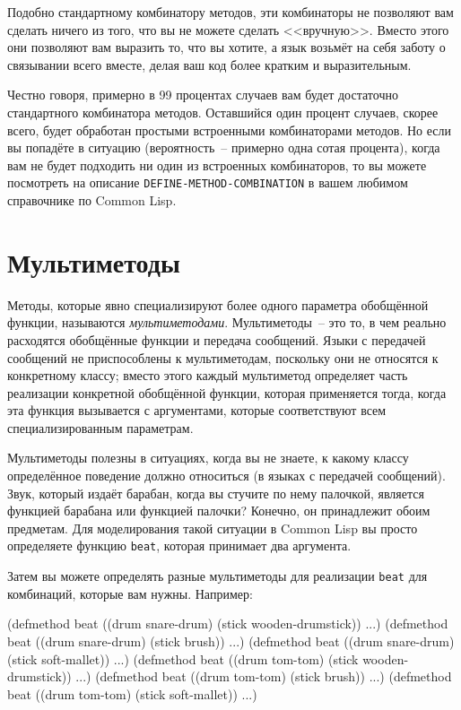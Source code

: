 Подобно стандартному комбинатору методов, эти комбинаторы не позволяют вам сделать ничего
из того, что вы не можете сделать <<вручную>>.  Вместо этого они позволяют вам выразить то,
что вы хотите, а язык возьмёт на себя заботу о связывании всего вместе, делая ваш код
более кратким и выразительным.

Честно говоря, примерно в 99 процентах случаев вам будет достаточно стандартного
комбинатора методов.  Оставшийся один процент случаев, скорее всего, будет обработан
простыми встроенными комбинаторами методов.  Но если вы попадёте в ситуацию
(вероятность~-- примерно одна сотая процента), когда вам не будет подходить ни один из
встроенных комбинаторов, то вы можете посмотреть на описание
\lstinline{DEFINE-METHOD-COMBINATION} в вашем любимом справочнике по Common Lisp.

\section{Мультиметоды}

Методы, которые явно специализируют более одного параметра обобщённой функции, называются
\textit{мультиметодами}.  Мультиметоды~-- это то, в чем реально расходятся обобщённые
функции и передача сообщений.  Языки с передачей сообщений не приспособлены к
мультиметодам, поскольку они не относятся к конкретному классу; вмес\-то этого каждый
мультиметод определяет часть реализации конкретной обобщённой функции, которая применяется
тогда, когда эта функция вызывается с аргументами, которые соответствуют всем
специализированным параметрам.

Мультиметоды полезны в ситуациях, когда вы не знаете, к какому классу определённое
поведение должно относиться (в языках с передачей сообщений).  Звук, который издаёт
барабан, когда вы стучите по нему палочкой, является функцией барабана или функцией
палочки?  Конечно, он принадлежит обоим предметам.  Для моделирования такой ситуации в
Common Lisp вы просто определяете функцию \lstinline{beat}, которая принимает два аргумента.

Затем вы можете определять разные мультиметоды для реализации \lstinline{beat} для комбинаций,
которые вам нужны. Например:

\begin{myverb}
(defmethod beat ((drum snare-drum) (stick wooden-drumstick)) ...)
(defmethod beat ((drum snare-drum) (stick brush)) ...)
(defmethod beat ((drum snare-drum) (stick soft-mallet)) ...)
(defmethod beat ((drum tom-tom) (stick wooden-drumstick)) ...)
(defmethod beat ((drum tom-tom) (stick brush)) ...)
(defmethod beat ((drum tom-tom) (stick soft-mallet)) ...)
\end{myverb}

